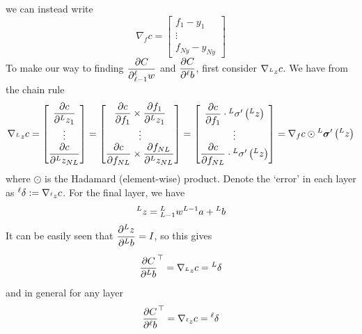 \documentclass[11pt]{report} %
\begin{document}
we can instead write
\begin{equation}
\nabla_{f}c=\begin{bmatrix}f_{1}-y_{1}\\
\vdots\\
f_{Ny}-y_{Ny}
\end{bmatrix}
\end{equation}
To make our way to finding $\dfrac{\partial C}{\partial\mathstrut_{\ell-1}^{\ell}w}$ and $\dfrac{\partial C}{\partial\mathstrut^{\ell}b}$, first consider $\nabla_{\mathstrut^{L}z}c$. We have from the chain rule
\begin{equation}
\nabla_{\mathstrut^{L}z}c=\begin{bmatrix}\dfrac{\partial c}{\partial\mathstrut^{L}z_{1}}\\
\vdots\\
\dfrac{\partial c}{\partial\mathstrut^{L}z_{NL}}
\end{bmatrix}=\begin{bmatrix}\dfrac{\partial c}{\partial f_{1}}\times\dfrac{\partial f_{1}}{\partial\mathstrut^{L}z_{1}}\\
\vdots\\
\dfrac{\partial c}{\partial f_{NL}}\times\dfrac{\partial f_{NL}}{\partial\mathstrut^{L}z_{NL}}
\end{bmatrix}=\begin{bmatrix}\dfrac{\partial c}{\partial f_{1}}\cdot\mathstrut^{L}\sigma'\left(\mathstrut^{L}z\right)\\
\vdots\\
\dfrac{\partial c}{\partial f_{NL}}\cdot\mathstrut^{L}\sigma'\left(\mathstrut^{L}z\right)
\end{bmatrix}=\nabla_{f}c\odot\mathstrut^{L}\boldsymbol{\sigma}'\left(\mathstrut^{L}z\right)
\end{equation}
where $\odot$ is the Hadamard (element-wise) product. Denote the `error' in each layer as $\mathstrut^{\ell}\delta:=\nabla_{\mathstrut^{\ell}z}c$. For the final layer, we have
\begin{equation}
\mathstrut^{L}z=\mathstrut_{L-1}^{L}w\mathstrut^{L-1}a+\mathstrut^{L}b
\end{equation}
It can be easily seen that $\dfrac{\partial\mathstrut^{L}z}{\partial\mathstrut^{L}b}=I$, so this gives
\begin{equation}
\dfrac{\partial C}{\partial\mathstrut^{L}b}^{\top}=\nabla_{\mathstrut^{L}z}c=\mathstrut^{L}\delta
\end{equation}
and in general for any layer
\begin{equation}
\dfrac{\partial C}{\partial\mathstrut^{\ell}b}^{\top}=\nabla_{\mathstrut^{\ell}z}c=\mathstrut^{\ell}\delta
\end{equation}
\end{document}
